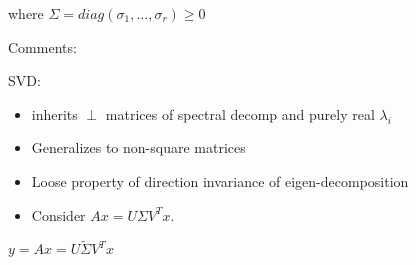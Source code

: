 where $\Sigma = diag(\sigma_1,...,\sigma_r)\geq 0$

Comments:

SVD: 

\begin{itemize}
	\item inherits $\perp$ matrices of spectral decomp and purely real $\lambda_i$
	
	\item Generalizes to non-square matrices
	
	\item Loose property of direction invariance of eigen-decomposition
	
	\item Consider $Ax = U\Sigma V^Tx$. 
\end{itemize}

\begin{example}
	$y = Ax = U\tilde{\Sigma} V^Tx$
	

\end{example}
